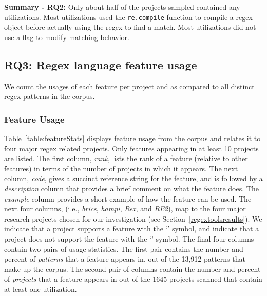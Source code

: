 \vspace{6pt}
\textbf{Summary - RQ2:}
Only about half of the projects sampled contained any utilizations.  Most utilizations used the {\tt re.compile} function to compile a regex object before actually using the regex to find a match.  Most utilizations did not use a flag to modify matching behavior.





\subsection{RQ3: Regex language feature usage}
\label{results:rq3}

We  count the usages of each feature per project and as compared to all distinct regex patterns in the corpus.



\subsubsection{Feature Usage}
\label{sec:featureUsage}
Table~\ref{table:featureStats} displays feature usage from the corpus and relates it to four major regex related projects. Only features appearing in at least 10 projects are listed.
The first column, \emph{rank}, lists the rank of a feature (relative to other features) in terms of the number of projects in which it appears. The next column, \emph{code}, gives a succinct reference string for the feature, and is followed by a \emph{description} column that provides a brief comment on what the feature does.  The \emph{example} column provides a short example of how the feature can be used.
The next four columns, (i.e., \emph{brics}, \emph{hampi}, \emph{Rex}, and \emph{RE2}), map to the four major research projects chosen for our investigation (see Section~\ref{regextoolsresults}).  We indicate that a project supports a feature with the `\yes' symbol, and indicate that a project does not support the feature with the `\no' symbol.
The final four columns contain two pairs of usage statistics.  The first pair contains the number and percent of \emph{patterns} that a feature appears in, out of the 13,912 patterns that make up the corpus.  The second pair of columns contain the number and percent of \emph{projects} that a feature appears in out of the 1645 projects scanned that contain at least one utilization.

